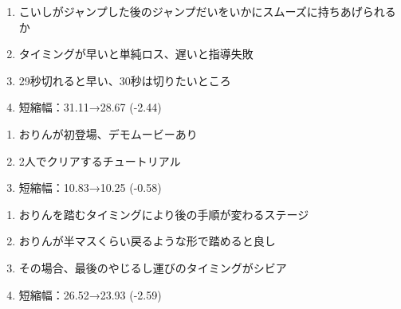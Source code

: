 \clearpage
\begin{enumerate}[label={\sarrow}]
\item こいしがジャンプした後のジャンプだいをいかにスムーズに持ちあげられるか
\item タイミングが早いと単純ロス、遅いと指導失敗
\item 29秒切れると早い、30秒は切りたいところ
\item 短縮幅：31.11→28.67 (-2.44)
\end{enumerate}








\begin{enumerate}[label={\sarrow}]
\item おりんが初登場、デモムービーあり
\item 2人でクリアするチュートリアル
\item 短縮幅：10.83→10.25 (-0.58)
\end{enumerate}



\begin{enumerate}[label={\sarrow}]
\item おりんを踏むタイミングにより後の手順が変わるステージ
\item おりんが半マスくらい戻るような形で踏めると良し
\item その場合、最後のやじるし運びのタイミングがシビア
\item 短縮幅：26.52→23.93 (-2.59)
\end{enumerate}



